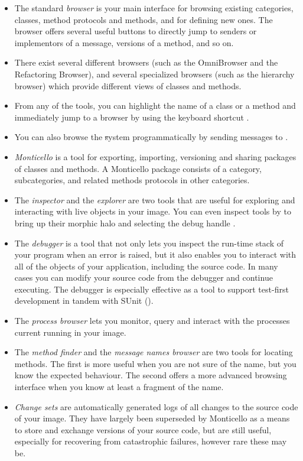 \documentclass[a4paper,10pt,twoside]{book}
\begin{document}
\begin{itemize}
  \item The standard \emph{browser} is your main interface for browsing existing categories, classes, method protocols and methods, and for defining new ones.
  The browser offers several useful buttons to directly jump to senders or implementors of a message, versions of a method, and so on.
  \item There exist several different browsers (such as the OmniBrowser and the Refactoring Browser), and several specialized browsers (such as the hierarchy browser) which provide different views of classes and methods.
  \item From any of the tools, you can highlight the name of a class or a method and immediately jump to a browser by using the keyboard shortcut .
  \item You can also browse the \st system programmatically by sending messages to .
  \item \emph{Monticello} is a tool for exporting, importing, versioning and sharing packages of classes and methods.
  A Monticello package consists of a category, subcategories, and related methods protocols in other categories.
  \item The \emph{inspector} and the \emph{explorer} are two tools that are useful for exploring and interacting with live objects in your image.
  You can even inspect tools by  to bring up their morphic halo and selecting the debug handle \debugHandle.
  \item The \emph{debugger} is a tool that not only lets you inspect the run-time stack of your program when an error is raised, but it also enables you to interact with all of the objects of your application, including the source code. In many cases you can modify your source code from the debugger and continue executing. The debugger is especially effective as a tool to support test-first development in tandem with SUnit ().
  \item The \emph{process browser} lets you monitor, query and interact with the processes current running in your image.
  \item The \emph{method finder} and the \emph{message names browser} are two tools for locating methods. The first is more useful when you are not sure of the name, but you know the expected behaviour. The second offers a more advanced browsing interface when you know at least a fragment of the name.
  \item \emph{Change sets} are automatically generated logs of all changes to the source code of your image. They have largely been superseded by Monticello as a means to store and exchange versions of your source code, but are still useful, especially for recovering from catastrophic failures, however rare these may be.

\end{itemize}
\end{document}
